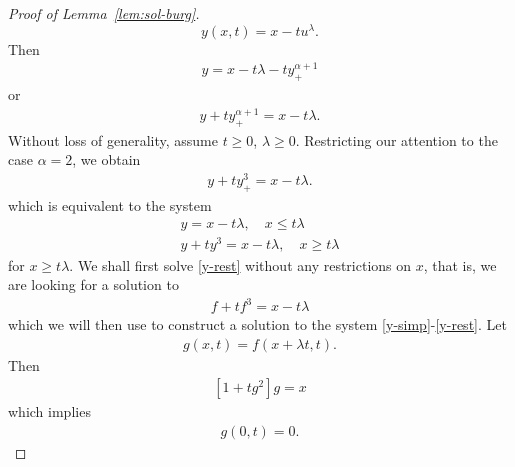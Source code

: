 \documentclass[12pt,reqno]{amsart}
\numberwithin{equation}{section}  %
\numberwithin{figure}{section}
\begin{document}
\begin{proof}[Proof of Lemma~\ref{lem:sol-burg}]
\begin{equation}
    \label{y-for-u}
    y(x,t) = x - tu^{\lambda}. 
\end{equation}
%
%
%
%
Then
%
%
\begin{equation*}
\begin{split}
y = x - t \lambda - t y_{+}^{\alpha + 1}
\end{split}
\end{equation*}
%
%
or
%
\begin{equation*}
\begin{split}
y + ty_{+}^{\alpha + 1} = x - t \lambda.
\end{split}
\end{equation*}
%
%
Without loss of generality, assume $t \ge 0$, $\lambda \ge 0$. 
Restricting our attention to the case $\alpha =2$, we obtain
\begin{equation}
    \label{y-equation}
\begin{split}
y + ty_{+}^{3} = x - t \lambda.
\end{split}
\end{equation}
which is equivalent to the system
%
%
\begin{gather}
    \label{y-simp}
    y= x - t \lambda, \quad x \le t \lambda
    \\
    \label{y-rest}
    y + ty^{3} = x - t \lambda, \quad x \ge t \lambda
\end{gather}
for $x \ge t \lambda$. We shall first solve \eqref{y-rest} without any
restrictions on $x$, that is, we are looking for a
solution to 
%
%
\begin{equation}
    \label{f-eq}
\begin{split}
f + tf^{3} = x - t \lambda
\end{split}
\end{equation}
%
%
which we will then use to 
construct a solution to the system
\eqref{y-simp}-\eqref{y-rest}. Let
%
%
\begin{equation*}
\begin{split}
    g(x,t) = f(x + \lambda t, t).
\end{split}
\end{equation*}
%
%
Then
%
%
\begin{equation}
    \label{g-eq}
\begin{split}
[1 + t g^{2}]g = x
\end{split}
\end{equation}
%
%
which implies
%
%
\begin{equation*}
\begin{split}
g(0, t) = 0.
\end{split}

\end{equation*}
\end{proof}
\end{document}
